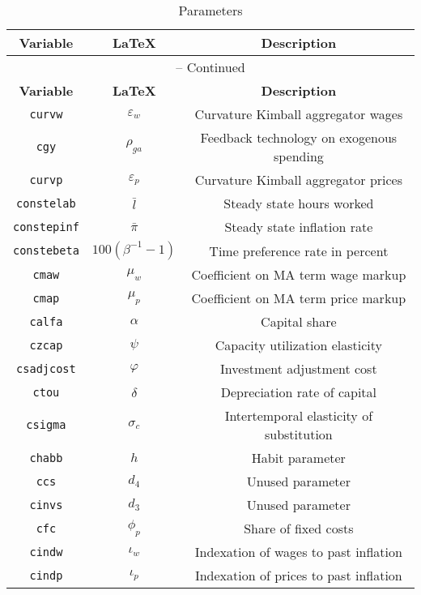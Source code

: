 \begin{center}
\begin{longtable}{ccc}
\caption{Parameters}\\%
\hline%
\multicolumn{1}{c}{\textbf{Variable}} &
\multicolumn{1}{c}{\textbf{\LaTeX}} &
\multicolumn{1}{c}{\textbf{Description}}\\%
\hline\hline%
\endfirsthead
\multicolumn{3}{c}{{\tablename} \thetable{} -- Continued}\\%
\hline%
\multicolumn{1}{c}{\textbf{Variable}} &
\multicolumn{1}{c}{\textbf{\LaTeX}} &
\multicolumn{1}{c}{\textbf{Description}}\\%
\hline\hline%
\endhead
\texttt{curvw} & ${\varepsilon_w}$ & Curvature Kimball aggregator wages\\
\texttt{cgy} & ${\rho_{ga}}$ & Feedback technology on exogenous spending\\
\texttt{curvp} & ${\varepsilon_p}$ & Curvature Kimball aggregator prices\\
\texttt{constelab} & ${\bar{l}}$ & Steady state hours worked\\
\texttt{constepinf} & ${\bar{\pi}}$ & Steady state inflation rate\\
\texttt{constebeta} & ${100(\beta^{-1}-1)}$ & Time preference rate in percent\\
\texttt{cmaw} & ${\mu_w}$ & Coefficient on MA term wage markup\\
\texttt{cmap} & ${\mu_p}$ & Coefficient on MA term price markup\\
\texttt{calfa} & ${\alpha}$ & Capital share\\
\texttt{czcap} & ${\psi}$ & Capacity utilization elasticity\\
\texttt{csadjcost} & ${\varphi}$ & Investment adjustment cost\\
\texttt{ctou} & ${\delta}$ & Depreciation rate of capital\\
\texttt{csigma} & ${\sigma_c}$ & Intertemporal elasticity of substitution\\
\texttt{chabb} & ${h}$ & Habit parameter\\
\texttt{ccs} & ${d_4}$ & Unused parameter\\
\texttt{cinvs} & ${d_3}$ & Unused parameter\\
\texttt{cfc} & ${\phi_p}$ & Share of fixed costs\\
\texttt{cindw} & ${\iota_w}$ & Indexation of wages to past inflation\\
\texttt{cindp} & ${\iota_p}$ & Indexation of prices to past inflation\\

\end{longtable}
\end{center}
